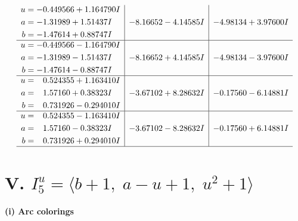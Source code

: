 \documentclass[1p]{elsarticle_modified}
\theoremstyle{definition}
\begin{document}
$$\begin{array}{c|c|c}
\begin{aligned}
u &= -0.449566 + 1.164790 I \\
a &= -1.31989 + 1.51437 I \\
b &= -1.47614 + 0.88747 I\end{aligned}
 & -8.16652 - 4.14585 I & -4.98134 + 3.97600 I \\ \hline\begin{aligned}
u &= -0.449566 - 1.164790 I \\
a &= -1.31989 - 1.51437 I \\
b &= -1.47614 - 0.88747 I\end{aligned}
 & -8.16652 + 4.14585 I & -4.98134 - 3.97600 I \\ \hline\begin{aligned}
u &= \phantom{-}0.524355 + 1.163410 I \\
a &= \phantom{-}1.57160 + 0.38323 I \\
b &= \phantom{-}0.731926 - 0.294010 I\end{aligned}
 & -3.67102 + 8.28632 I & -0.17560 - 6.14881 I \\ \hline\begin{aligned}
u &= \phantom{-}0.524355 - 1.163410 I \\
a &= \phantom{-}1.57160 - 0.38323 I \\
b &= \phantom{-}0.731926 + 0.294010 I\end{aligned}
 & -3.67102 - 8.28632 I & -0.17560 + 6.14881 I\\
 \hline 
 \end{array}$$\newpage\newpage\renewcommand{\arraystretch}{1}
\centering \section*{V. $I^u_{5}= \langle b+1,\;a- u+1,\;u^2+1 \rangle$}
\flushleft \textbf{(i) Arc colorings}\\
\end{document}
